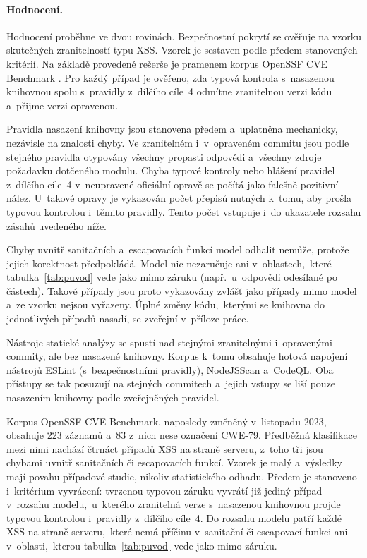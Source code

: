 \paragraph{Hodnocení.}
Hodnocení proběhne ve dvou rovinách. Bezpečnostní pokrytí se ověřuje na vzorku skutečných zranitelností typu XSS. Vzorek je sestaven podle předem stanovených kritérií. Na základě provedené rešerše je pramenem korpus OpenSSF CVE Benchmark \parencite{ossfCveBenchmark}. Pro každý případ je ověřeno, zda typová kontrola s~nasazenou knihovnou spolu s~pravidly z~dílčího cíle~4 odmítne zranitelnou verzi kódu a~přijme verzi opravenou.

Pravidla nasazení knihovny jsou stanovena předem a~uplatněna mechanicky, nezávisle na znalosti chyby. Ve zranitelném i~v~opraveném commitu jsou podle stejného pravidla otypovány všechny propasti odpovědi a~všechny zdroje požadavku dotčeného modulu. Chyba typové kontroly nebo hlášení pravidel z~dílčího cíle~4 v~neupravené oficiální opravě se počítá jako falešně pozitivní nález. U~takové opravy je vykazován počet přepisů nutných k~tomu, aby prošla typovou kontrolou i~těmito pravidly. Tento počet vstupuje i~do ukazatele rozsahu zásahů uvedeného níže.

Chyby uvnitř sanitačních a~escapovacích funkcí model odhalit nemůže, protože jejich korektnost předpokládá. Model nic nezaručuje ani v~oblastech,~které tabulka~\ref{tab:puvod} vede jako mimo záruku (např.~u~odpovědi odesílané po částech). Takové případy jsou proto vykazovány zvlášť jako případy mimo model a~ze vzorku nejsou vyřazeny. Úplné změny kódu,~kterými se knihovna do jednotlivých případů nasadí, se zveřejní v~příloze práce.

Nástroje statické analýzy se spustí nad stejnými zranitelnými i~opravenými commity, ale bez nasazené knihovny. Korpus k~tomu obsahuje hotová napojení nástrojů ESLint (s~bezpečnostními pravidly), NodeJSScan a~CodeQL. Oba přístupy se tak posuzují na stejných commitech a~jejich vstupy se liší pouze nasazením knihovny podle zveřejněných pravidel.

Korpus OpenSSF CVE Benchmark, naposledy změněný v~listopadu 2023, obsahuje 223 záznamů a~83 z~nich nese označení CWE-79. Předběžná klasifikace mezi nimi nachází čtrnáct případů XSS na straně serveru, z~toho tři jsou chybami uvnitř sanitačních či escapovacích funkcí. Vzorek je malý a~výsledky mají povahu případové studie, nikoliv statistického odhadu. Předem je stanoveno i~kritérium vyvrácení: tvrzenou typovou záruku vyvrátí již jediný případ v~rozsahu modelu,~u~kterého zranitelná verze s~nasazenou knihovnou projde typovou kontrolou i~pravidly z~dílčího cíle~4. Do rozsahu modelu patří každé XSS na straně serveru,~které nemá příčinu v~sanitační či escapovací funkci ani v~oblasti,~kterou tabulka~\ref{tab:puvod} vede jako mimo záruku.

